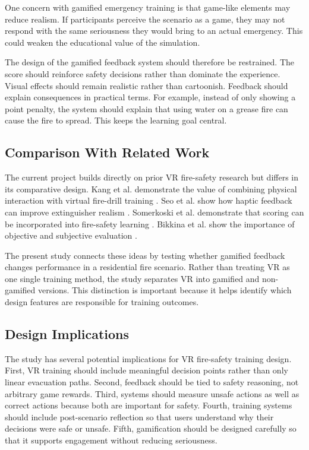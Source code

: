 \documentclass[manuscript, review]{acmart}
\begin{document}
{One concern with gamified emergency training is that game-like elements may reduce realism. If participants perceive the scenario as a game, they may not respond with the same seriousness they would bring to an actual emergency. This could weaken the educational value of the simulation.

The design of the gamified feedback system should therefore be restrained. The score should reinforce safety decisions rather than dominate the experience. Visual effects should remain realistic rather than cartoonish. Feedback should explain consequences in practical terms. For example, instead of only showing a point penalty, the system should explain that using water on a grease fire can cause the fire to spread. This keeps the learning goal central.

\subsection{Comparison With Related Work}

The current project builds directly on prior VR fire-safety research but differs in its comparative design. Kang et al. demonstrate the value of combining physical interaction with virtual fire-drill training \cite{kang2022combining}. Seo et al. show how haptic feedback can improve extinguisher realism \cite{seo2019interactive}. Somerkoski et al. demonstrate that scoring can be incorporated into fire-safety learning \cite{somerkoski2020digital}. Bikkina et al. show the importance of objective and subjective evaluation \cite{bikkina2025learnings}.

The present study connects these ideas by testing whether gamified feedback changes performance in a residential fire scenario. Rather than treating VR as one single training method, the study separates VR into gamified and non-gamified versions. This distinction is important because it helps identify which design features are responsible for training outcomes.

\subsection{Design Implications}

The study has several potential implications for VR fire-safety training design. First, VR training should include meaningful decision points rather than only linear evacuation paths. Second, feedback should be tied to safety reasoning, not arbitrary game rewards. Third, systems should measure unsafe actions as well as correct actions because both are important for safety. Fourth, training systems should include post-scenario reflection so that users understand why their decisions were safe or unsafe. Fifth, gamification should be designed carefully so that it supports engagement without reducing seriousness.

}
\end{document}
